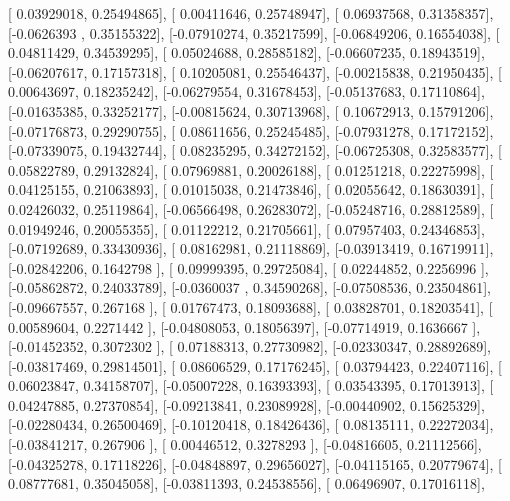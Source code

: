 \documentclass{article}
\begin{document}
       [ 0.03929018,  0.25494865],
       [ 0.00411646,  0.25748947],
       [ 0.06937568,  0.31358357],
       [-0.0626393 ,  0.35155322],
       [-0.07910274,  0.35217599],
       [-0.06849206,  0.16554038],
       [ 0.04811429,  0.34539295],
       [ 0.05024688,  0.28585182],
       [-0.06607235,  0.18943519],
       [-0.06207617,  0.17157318],
       [ 0.10205081,  0.25546437],
       [-0.00215838,  0.21950435],
       [ 0.00643697,  0.18235242],
       [-0.06279554,  0.31678453],
       [-0.05137683,  0.17110864],
       [-0.01635385,  0.33252177],
       [-0.00815624,  0.30713968],
       [ 0.10672913,  0.15791206],
       [-0.07176873,  0.29290755],
       [ 0.08611656,  0.25245485],
       [-0.07931278,  0.17172152],
       [-0.07339075,  0.19432744],
       [ 0.08235295,  0.34272152],
       [-0.06725308,  0.32583577],
       [ 0.05822789,  0.29132824],
       [ 0.07969881,  0.20026188],
       [ 0.01251218,  0.22275998],
       [ 0.04125155,  0.21063893],
       [ 0.01015038,  0.21473846],
       [ 0.02055642,  0.18630391],
       [ 0.02426032,  0.25119864],
       [-0.06566498,  0.26283072],
       [-0.05248716,  0.28812589],
       [ 0.01949246,  0.20055355],
       [ 0.01122212,  0.21705661],
       [ 0.07957403,  0.24346853],
       [-0.07192689,  0.33430936],
       [ 0.08162981,  0.21118869],
       [-0.03913419,  0.16719911],
       [-0.02842206,  0.1642798 ],
       [ 0.09999395,  0.29725084],
       [ 0.02244852,  0.2256996 ],
       [-0.05862872,  0.24033789],
       [-0.0360037 ,  0.34590268],
       [-0.07508536,  0.23504861],
       [-0.09667557,  0.267168  ],
       [ 0.01767473,  0.18093688],
       [ 0.03828701,  0.18203541],
       [ 0.00589604,  0.2271442 ],
       [-0.04808053,  0.18056397],
       [-0.07714919,  0.1636667 ],
       [-0.01452352,  0.3072302 ],
       [ 0.07188313,  0.27730982],
       [-0.02330347,  0.28892689],
       [-0.03817469,  0.29814501],
       [ 0.08606529,  0.17176245],
       [ 0.03794423,  0.22407116],
       [ 0.06023847,  0.34158707],
       [-0.05007228,  0.16393393],
       [ 0.03543395,  0.17013913],
       [ 0.04247885,  0.27370854],
       [-0.09213841,  0.23089928],
       [-0.00440902,  0.15625329],
       [-0.02280434,  0.26500469],
       [-0.10120418,  0.18426436],
       [ 0.08135111,  0.22272034],
       [-0.03841217,  0.267906  ],
       [ 0.00446512,  0.3278293 ],
       [-0.04816605,  0.21112566],
       [-0.04325278,  0.17118226],
       [-0.04848897,  0.29656027],
       [-0.04115165,  0.20779674],
       [ 0.08777681,  0.35045058],
       [-0.03811393,  0.24538556],
       [ 0.06496907,  0.17016118],
\end{document}
